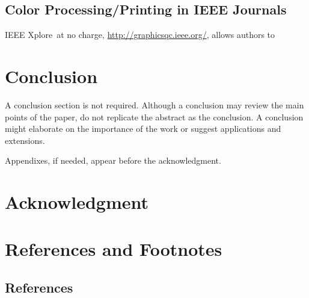 \documentclass[journal,twoside,web]{ieeecolor}
\begin{document}
\subsection{Color Processing/Printing in IEEE Journals}
IEEE Xplore\textregistered\ at no charge, \underline{http://graphicsqc.ieee.org/}, allows authors to 

\section{Conclusion}
A conclusion section is not required. Although a conclusion may review the 
main points of the paper, do not replicate the abstract as the conclusion. A 
conclusion might elaborate on the importance of the work or suggest 
applications and extensions. 

\appendices

Appendixes, if needed, appear before the acknowledgment.

\section*{Acknowledgment}



\section*{References and Footnotes}

\subsection{References}
\end{document}
